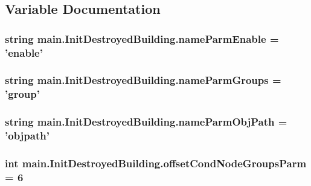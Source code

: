 \subsection{Variable Documentation}
\hypertarget{namespacemain_1_1_init_destroyed_building_ab3ccb4486ca5070b11f9df5fbd4d1698}{
\subsubsection[{name\-Parm\-Enable}]{\setlength{\rightskip}{0pt plus 5cm}string main.\-Init\-Destroyed\-Building.\-name\-Parm\-Enable = 'enable'}}\label{namespacemain_1_1_init_destroyed_building_ab3ccb4486ca5070b11f9df5fbd4d1698}
\hypertarget{namespacemain_1_1_init_destroyed_building_a153234f6c1239470d872c73878045631}{
\subsubsection[{name\-Parm\-Groups}]{\setlength{\rightskip}{0pt plus 5cm}string main.\-Init\-Destroyed\-Building.\-name\-Parm\-Groups = 'group'}}\label{namespacemain_1_1_init_destroyed_building_a153234f6c1239470d872c73878045631}
\hypertarget{namespacemain_1_1_init_destroyed_building_abdfde9f8b443891807aa36e2ac0902df}{
\subsubsection[{name\-Parm\-Obj\-Path}]{\setlength{\rightskip}{0pt plus 5cm}string main.\-Init\-Destroyed\-Building.\-name\-Parm\-Obj\-Path = 'objpath'}}\label{namespacemain_1_1_init_destroyed_building_abdfde9f8b443891807aa36e2ac0902df}
\hypertarget{namespacemain_1_1_init_destroyed_building_a483d1635fc631db9b1278145032d0955}{
\subsubsection[{offset\-Cond\-Node\-Groups\-Parm}]{\setlength{\rightskip}{0pt plus 5cm}int main.\-Init\-Destroyed\-Building.\-offset\-Cond\-Node\-Groups\-Parm = 6}}\label{namespacemain_1_1_init_destroyed_building_a483d1635fc631db9b1278145032d0955}
